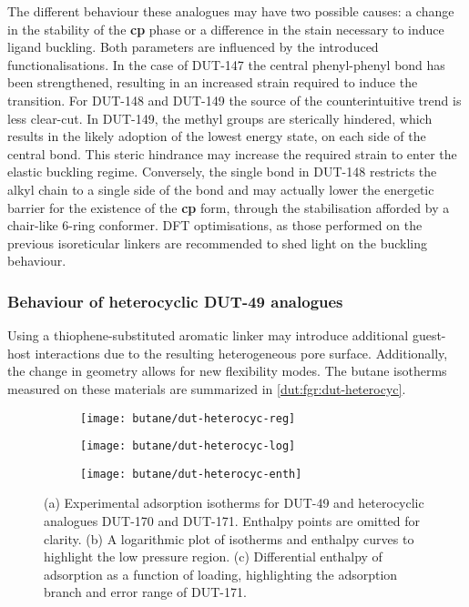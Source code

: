 The different behaviour these analogues may have two possible
causes: a change in the stability of the \textbf{cp} phase or a 
difference in the stain necessary to induce ligand buckling. Both
parameters are influenced by the introduced functionalisations. 
In the case of DUT-147 the central phenyl-phenyl bond
has been strengthened, resulting in an increased strain required to
induce the transition. For DUT-148 and DUT-149 the source of the 
counterintuitive trend is less clear-cut. In DUT-149, the methyl
groups are sterically hindered, which results in the likely
adoption of the lowest energy state, on each side of the central
bond. This steric hindrance may increase the required strain to 
enter the elastic buckling regime. Conversely, the 
single bond in DUT-148 restricts the alkyl chain to a single 
side of the bond and may actually lower the energetic barrier for
the existence of the \textbf{cp} form, through the stabilisation
afforded by a chair-like 6-ring conformer. DFT optimisations, as 
those performed on the previous isoreticular linkers are 
recommended to shed light on the buckling behaviour.

\subsubsection{Behaviour of heterocyclic DUT-49 analogues}

Using a thiophene-substituted aromatic linker may introduce additional
guest-host interactions due to the resulting heterogeneous pore
surface. Additionally, the change in geometry allows for new 
flexibility modes. The butane isotherms measured on these materials
are summarized in \autoref{dut:fgr:dut-heterocyc}.

\begin{figure}[htb]
    \centering
    \begin{subfigure}{0.33\linewidth}
        \texttt{[image: butane/dut-heterocyc-reg]}%
        \caption{}\label{dut:fgr:dut-heterocyc-reg}
    \end{subfigure}%
    \begin{subfigure}{0.33\linewidth}
        \texttt{[image: butane/dut-heterocyc-log]}%
        \caption{}\label{dut:fgr:dut-heterocyc-log}
    \end{subfigure}%
    \begin{subfigure}{0.33\linewidth}
        \texttt{[image: butane/dut-heterocyc-enth]}%
        \caption{}\label{dut:fgr:dut-heterocyc-enth}
    \end{subfigure}%
    \caption{(a) Experimental adsorption isotherms for DUT-49 and 
    heterocyclic analogues DUT-170 and DUT-171. 
    Enthalpy points are omitted for clarity. 
    (b) A logarithmic plot of isotherms and enthalpy curves
    to highlight the low pressure region. 
    (c) Differential enthalpy of adsorption as a function of loading, highlighting the 
    adsorption branch and error range of DUT-171.}%
    \label{dut:fgr:dut-heterocyc}
\end{figure}

